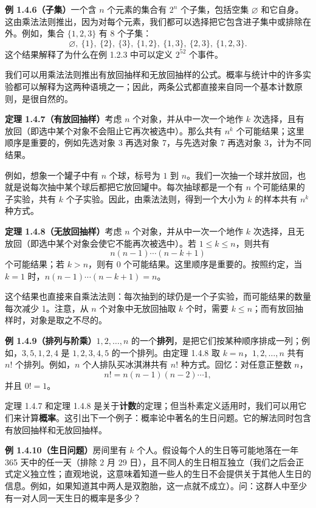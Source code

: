 \documentclass[UTF8, 12pt, fontset=fandol, oneside]{ctexart}
\begin{document}
\noindent\textbf{例 1.4.6（子集）}\quad 一个含 $n$ 个元素的集合有 $2^n$ 个子集，包括空集 $\varnothing$ 和它自身。这由乘法法则推出，因为对每个元素，我们都可以选择把它包含进子集中或排除在外。例如，集合 $\{1,2,3\}$ 有 8 个子集：
\[
  \varnothing,\ \{1\},\ \{2\},\ \{3\},\ \{1,2\},\ \{1,3\},\ \{2,3\},\ \{1,2,3\}.
\]
这个结果解释了为什么在例 1.2.3 中可以定义 $2^{52}$ 个事件。

我们可以用乘法法则推出有放回抽样和无放回抽样的公式。概率与统计中的许多实验都可以解释为这两种语境之一；因此，两条公式都直接来自同一个基本计数原则，是很自然的。

\noindent\textbf{定理 1.4.7（有放回抽样）}\quad 考虑 $n$ 个对象，并从中一次一个地作 $k$ 次选择，且有放回（即选中某个对象不会阻止它再次被选中）。那么共有 $n^k$ 个可能结果；这里顺序是重要的，例如先选对象 3 再选对象 7，与先选对象 7 再选对象 3，计为不同结果。

例如，想象一个罐子中有 $n$ 个球，标号为 $1$ 到 $n$。我们一次抽一个球并放回，也就是说每次抽中某个球后都把它放回罐中。每次抽球都是一个有 $n$ 个可能结果的子实验，共有 $k$ 个子实验。因此，由乘法法则，得到一个大小为 $k$ 的样本共有 $n^k$ 种方式。

\noindent\textbf{定理 1.4.8（无放回抽样）}\quad 考虑 $n$ 个对象，并从中一次一个地作 $k$ 次选择，且无放回（即选中某个对象会使它不能再次被选中）。若 $1\le k\le n$，则共有
\[
  n(n-1)\cdots(n-k+1)
\]
个可能结果；若 $k>n$，则有 0 个可能结果。这里顺序是重要的。按照约定，当 $k=1$ 时，$n(n-1)\cdots(n-k+1)=n$。

这个结果也直接来自乘法法则：每次抽到的球仍是一个子实验，而可能结果的数量每次减少 1。注意，从 $n$ 个对象中无放回抽取 $k$ 个时，需要 $k\le n$；而有放回抽样时，对象是取之不尽的。

\noindent\textbf{例 1.4.9（排列与阶乘）}\quad $1,2,\ldots,n$ 的一个\textbf{排列}，是把它们按某种顺序排成一列；例如，$3,5,1,2,4$ 是 $1,2,3,4,5$ 的一个排列。由定理 1.4.8 取 $k=n$，$1,2,\ldots,n$ 共有 $n!$ 个排列。例如，$n$ 个人排队买冰淇淋共有 $n!$ 种方式。回忆：对任意正整数 $n$，
\[
  n!=n(n-1)(n-2)\cdots 1,
\]
并且 $0!=1$。

定理 1.4.7 和定理 1.4.8 是关于\textbf{计数}的定理；但当朴素定义适用时，我们可以用它们来计算\textbf{概率}。这引出下一个例子：概率论中著名的生日问题。它的解法同时包含有放回抽样和无放回抽样。

\noindent\textbf{例 1.4.10（生日问题）}\quad 房间里有 $k$ 个人。假设每个人的生日等可能地落在一年 365 天中的任一天（排除 2 月 29 日），且不同人的生日相互独立（我们之后会正式定义独立性；直观地说，这意味着知道一些人的生日不会提供关于其他人生日的信息。例如，如果知道其中两人是双胞胎，这一点就不成立）。问：这群人中至少有一对人同一天生日的概率是多少？
\end{document}
